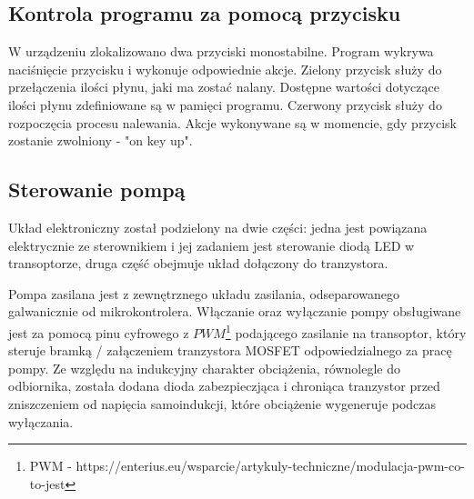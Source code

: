 \documentclass[11pt]{article}
\begin{document}
\subsection{Kontrola programu za pomocą przycisku}
W urządzeniu zlokalizowano dwa przyciski monostabilne. Program wykrywa naciśnięcie przycisku i wykonuje odpowiednie akcje.
Zielony przycisk służy do przełączenia ilości płynu, jaki ma zostać nalany. Dostępne wartości dotyczące ilości płynu zdefiniowane 
są w pamięci programu. Czerwony przycisk służy do rozpoczęcia procesu nalewania. Akcje wykonywane są w momencie, gdy przycisk
zostanie zwolniony - "on key up".

\subsection{Sterowanie pompą}
 
Układ elektroniczny został podzielony na dwie części: jedna jest powiązana elektrycznie ze sterownikiem i jej zadaniem jest sterowanie diodą LED w transoptorze, druga część obejmuje układ dołączony do tranzystora.

Pompa zasilana jest z zewnętrznego układu zasilania, odseparowanego galwanicznie od mikrokontrolera. Włączanie oraz wyłączanie pompy obsługiwane jest za pomocą pinu cyfrowego z $PWM$\footnote{PWM - https://enterius.eu/wsparcie/artykuly-techniczne/modulacja-pwm-co-to-jest} podającego zasilanie na transoptor, który steruje bramką / załączeniem tranzystora MOSFET odpowiedzialnego za pracę pompy. 
Ze względu na indukcyjny charakter obciążenia, równolegle do odbiornika, została dodana dioda zabezpieczjąca i chroniąca tranzystor przed zniszczeniem od napięcia samoindukcji, które obciążenie wygeneruje podczas wyłączania.


\FloatBarrier
\end{document}
